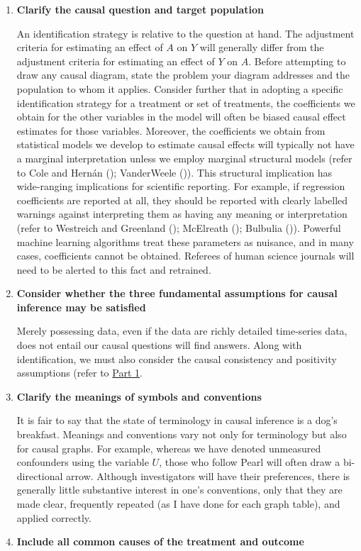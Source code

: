 \documentclass[
  single column]{article}
\begin{document}
\begin{enumerate}
\def\labelenumi{\arabic{enumi}.}
\item
  \textbf{Clarify the causal question and target population}

  An identification strategy is relative to the question at hand. The
  adjustment criteria for estimating an effect of \(A\) on \(Y\) will
  generally differ from the adjustment criteria for estimating an effect
  of \(Y\) on \(A\). Before attempting to draw any causal diagram, state
  the problem your diagram addresses and the population to whom it
  applies. Consider further that in adopting a specific identification
  strategy for a treatment or set of treatments, the coefficients we
  obtain for the other variables in the model will often be biased
  causal effect estimates for those variables. Moreover, the
  coefficients we obtain from statistical models we develop to estimate
  causal effects will typically not have a marginal interpretation
  unless we employ marginal structural models (refer to Cole and Hernán
  (); VanderWeele
  ()). This structural implication
  has wide-ranging implications for scientific reporting. For example,
  if regression coefficients are reported at all, they should be
  reported with clearly labelled warnings against interpreting them as
  having any meaning or interpretation (refer to Westreich and Greenland
  (); McElreath
  (); Bulbulia
  ()). Powerful machine learning
  algorithms treat these parameters as nuisance, and in many cases,
  coefficients cannot be obtained. Referees of human science journals
  will need to be alerted to this fact and retrained.
\item
  \textbf{Consider whether the three fundamental assumptions for causal
  inference may be satisfied}

  Merely possessing data, even if the data are richly detailed
  time-series data, does not entail our causal questions will find
  answers. Along with identification, we must also consider the causal
  consistency and positivity assumptions (refer to
  \hyperref[id-sec-1]{Part 1}.
\item
  \textbf{Clarify the meanings of symbols and conventions}

  It is fair to say that the state of terminology in causal inference is
  a dog's breakfast. Meanings and conventions vary not only for
  terminology but also for causal graphs. For example, whereas we have
  denoted unmeasured confounders using the variable \(U\), those who
  follow Pearl will often draw a bi-directional arrow. Although
  investigators will have their preferences, there is generally little
  substantive interest in one's conventions, only that they are made
  clear, frequently repeated (as I have done for each graph table), and
  applied correctly.
\item
  \textbf{Include all common causes of the treatment and outcome}


\end{enumerate}
\end{document}
